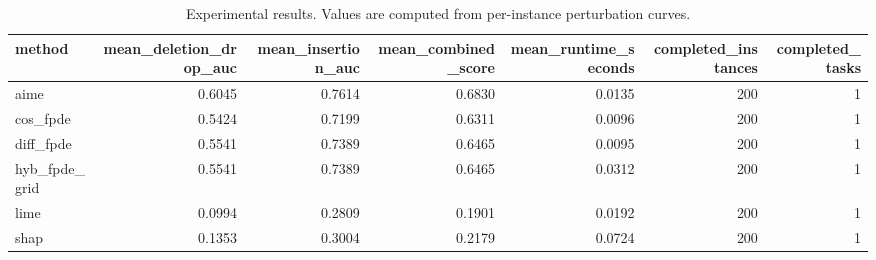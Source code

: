 \begin{table}[t]
\caption{Experimental results. Values are computed from per-instance perturbation curves.}
\label{tab:main_results_computed}
\centering
\begin{tabular}{lrrrrrr}
\toprule
method & mean\_deletion\_drop\_auc & mean\_insertion\_auc & mean\_combined\_score & mean\_runtime\_seconds & completed\_instances & completed\_tasks \\
\midrule
aime & 0.6045 & 0.7614 & 0.6830 & 0.0135 & 200 & 1 \\
cos\_fpde & 0.5424 & 0.7199 & 0.6311 & 0.0096 & 200 & 1 \\
diff\_fpde & 0.5541 & 0.7389 & 0.6465 & 0.0095 & 200 & 1 \\
hyb\_fpde\_grid & 0.5541 & 0.7389 & 0.6465 & 0.0312 & 200 & 1 \\
lime & 0.0994 & 0.2809 & 0.1901 & 0.0192 & 200 & 1 \\
shap & 0.1353 & 0.3004 & 0.2179 & 0.0724 & 200 & 1 \\
\bottomrule
\end{tabular}

\end{table}
